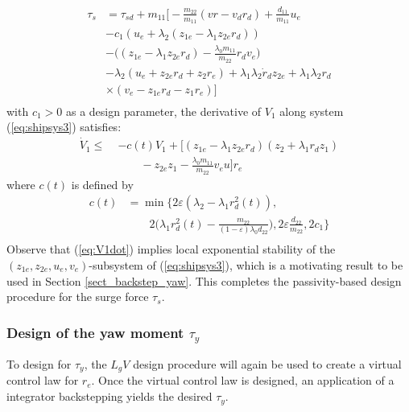 \documentclass[amsthm, twocolumn]{autart}
\begin{document}
\begin{equation}
\begin{split}
\tau_s & = \tau_{sd} + m_{11} \bigg[ -\frac{m_{22}}{m_{11}}(v r-v_d r_d) + \frac{d_{11}}{m_{11}}u_e \\
& -c_1 (u_e + \lambda_2 (z_{1e} - \lambda_1 z_{2e} r_d)) \\ 
& - \bigg ((z_{1e} - \lambda_1 z_{2e} r_d) - \frac{\lambda_0 m_{11}}{m_{22}}r_d v_e \bigg)\\
& - \lambda_2 (u_e + z_{2e} r_d + z_2 r_e) + \lambda_1 \lambda_2 \dot{r}_d z_{2e} + \lambda_1 \lambda_2 r_d \\
& \times (v_e - z_{1e} r_d - z_1 r_e) \bigg] \\
\end{split}
\label{eq:pass_tau_s}
\end{equation}
%
%
with $c_1>0$ as a design parameter, the derivative of $V_1$ along system (\ref{eq:shipsys3}) satisfies:
%
%
\begin{equation}
\begin{split}
\dot{V}_1 \le \; & -c(t) V_1 + \bigg[(z_{1e} - \lambda_1 z_{2e} r_d) (z_2 + \lambda_1 r_d z_1) \\
&\qquad - z_{2e} z_1 - \frac{\lambda_0 m_{11}}{m_{22}} v_e u \bigg] r_e
\end{split}
\label{eq:V1dot}
\end{equation}
%
%
where $c(t)$ is defined by
%
%
\begin{equation}
\begin{split}
c(t) &= \min \bigg\{ 2\varepsilon (\lambda_2-\lambda_1 r_d^2(t)), \\
& \qquad 2\bigg( \lambda_1 r_d^2(t) - \frac{m_{22}}{(1-\varepsilon) \lambda_0 d_{22}}\bigg), 2\varepsilon \frac{d_{22}}{m_{22}}, 2c_1 \bigg\} \\ 
\end{split}
\end{equation}
%
%
Observe that (\ref{eq:V1dot}) implies local exponential stability of the $(z_{1e},z_{2e},u_e,v_e)$-subsystem of (\ref{eq:shipsys3}), which is a motivating result to be used in Section \ref{sect_backstep_yaw}. This completes the passivity-based design procedure for the surge force $\tau_s$.
%
\subsubsection{Design of the yaw moment $\tau_y$}
To design for $\tau_y$, the $L_gV$ design procedure will again be used to create a virtual control law for $r_e$. Once the virtual control law is designed, an application of a integrator backstepping yields the desired $\tau_y$.
\end{document}
